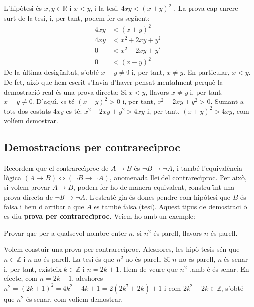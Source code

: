 \begin{solucio}
L'hip\`{o}tesi \'{e}s $x,y\in\mathbb{R}$ i $x<y$, i la tesi, $4xy<(x+y)^{2}$%
. La prova cap enrere surt de la tesi, i, per tant, podem fer es seg\"{u}ent:%
\begin{align*}
4xy & <(x+y)^{2} \\
4xy & <x^{2}+2xy+y^{2} \\
0 & <x^{2}-2xy+y^{2} \\
0 & <(x-y)^{2}
\end{align*}
De la \'{u}ltima desig\"{u}altat, s'obt\'{e} $x-y\neq0$ i, per tant, $x\neq y
$. En particular, $x<y$. De fet, aix\`{o} que hem escrit s'havia d'haver
pensat mentalment perqu\`{e} la demostraci\'{o} real \'{e}s una prova
directa: Si $x<y$, llavors $x\neq y$ i, per tant, $x-y\neq0$. D'aqu\'{\i},
es t\'{e} $(x-y)^{2}>0$ i, per tant, $x^{2}-2xy+y^{2}>0$. Sumant a tots dos
costats $4xy$ es t\'{e}: $x^{2}+2xy+y^{2}>4xy$ i, per tant, $(x+y)^{2}>4xy$,
com volíem demostrar.
\end{solucio}

\subsection{Demostracions per contrarec\'{\i}proc}

Recordem que el contrarec\'{\i}proc de $A\longrightarrow B$ \'{e}s $\lnot
B\longrightarrow\lnot A$, i tamb\'{e} l'equival\`{e}ncia l\`{o}gica $\left(
A\longrightarrow B\right) \Longleftrightarrow\left( \lnot B\longrightarrow
\lnot A\right) $, anomenada llei del contrarec\'{\i}proc. Per aix\`{o}, si
volem provar $A\longrightarrow B$, podem fer-ho de manera equivalent, constru%
\"{\i}nt una prova directa de $\lnot B\longrightarrow\lnot A$. L'estrat\`{e}%
gia \'{e}s doncs pendre com hip\`{o}tesi que $B$ \'{e}s falsa i hem
d'arribar a que $A$ \'{e}s tamb\'{e} falsa (tesi). Aquest tipus de demostraci%
\'{o} es diu \textbf{prova per contrarec\'{\i}proc}. Veiem-ho amb un exemple:

\begin{exemple}
\label{ex:n2-parell}Provar que per a qualsevol nombre enter $n$, si $n^{2}$ \'{e}s
parell, llavors $n$ \'{e}s parell.
\end{exemple}

\begin{solucio}
Volem constuir una prova per contrarec\'{\i}proc. Aleshores, les hip\`{o}%
tesis s\'{o}n que $n\in\mathbb{Z}$ i $n$ no \'{e}s parell. La tesi \'{e}s
que $n^{2}$ no \'{e}s parell. Si $n$ no \'{e}s parell, $n$ \'{e}s senar i,
per tant, existeix $k\in\mathbb{Z}$ i $n=2k+1$. Hem de veure que $n^{2}$ tamb%
\'{e} \'{e}s senar. En efecte, com $n=2k+1$, aleshores $n^{2}=\left(
2k+1\right) ^{2}=4k^{2}+4k+1=2\left( 2k^{2}+2k\right) +1$ i com $2k^{2}+2k\in%
\mathbb{Z}$, s'obt\'{e} que $n^{2}$ \'{e}s senar, com volíem demostrar.
\end{solucio}

